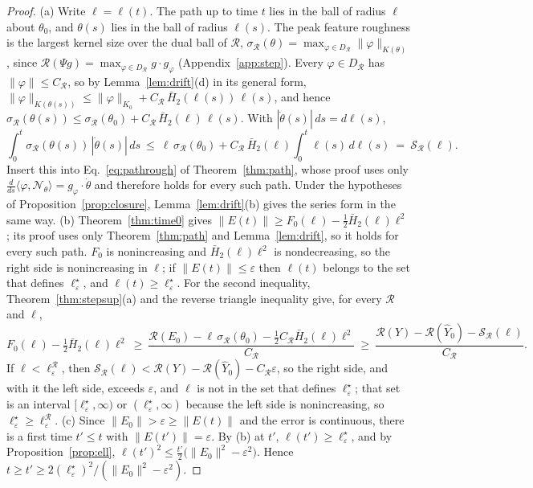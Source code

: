 \documentclass[11pt]{article}
\theoremstyle{definition}
\theoremstyle{remark}
\newcommand{\Net}{\mathcal{N}_\theta}    %
\newcommand{\Rgh}{\mathcal{R}}           %
\newcommand{\sR}{\sigma_{\Rgh}}
\newcommand{\CR}{C_{\Rgh}}
\newcommand{\ip}[2]{\langle #1,#2\rangle}
\begin{document}
\begin{proof}
(a) Write $\ell = \ell(t)$.
The path up to time $t$ lies in the ball of radius $\ell$ about $\theta_0$, and $\theta(s)$ lies in the ball of radius $\ell(s)$.
The peak feature roughness is the largest kernel size over the dual ball of $\Rgh$, $\sR(\theta) = \max_{\varphi\in D_\Rgh}\|\varphi\|_{K(\theta)}$, since $\Rgh(\Psi g) = \max_{\varphi\in D_\Rgh}g\cdot g_\varphi$ (Appendix~\ref{app:step}).
Every $\varphi\in D_\Rgh$ has $\|\varphi\|\le\CR$, so by Lemma~\ref{lem:drift}(d) in its general form, $\|\varphi\|_{K(\theta(s))}\le\|\varphi\|_{K_0} + \CR\,\bar H_2(\ell(s))\,\ell(s)$, and hence $\sR(\theta(s))\le\sR(\theta_0) + \CR\,\bar H_2(\ell)\,\ell(s)$.
With $|\dot\theta(s)|\,ds = d\ell(s)$,
\[
\int_0^t\sR(\theta(s))\,|\dot\theta(s)|\,ds\ \le\ \ell\,\sR(\theta_0) + \CR\,\bar H_2(\ell)\int_0^t\ell(s)\,d\ell(s)\ =\ \mathcal{S}_\Rgh(\ell).
\]
Insert this into Eq.~\eqref{eq:pathrough} of Theorem~\ref{thm:path}, whose proof uses only $\frac{d}{ds}\ip{\varphi}{\Net} = g_\varphi\cdot\dot\theta$ and therefore holds for every such path.
Under the hypotheses of Proposition~\ref{prop:closure}, Lemma~\ref{lem:drift}(b) gives the series form in the same way.
(b) Theorem~\ref{thm:time0} gives $\|E(t)\|\ge F_0(\ell) - \tfrac12\bar H_2(\ell)\ell^2$; its proof uses only Theorem~\ref{thm:path} and Lemma~\ref{lem:drift}, so it holds for every such path.
$F_0$ is nonincreasing and $\bar H_2(\ell)\ell^2$ is nondecreasing, so the right side is nonincreasing in $\ell$; if $\|E(t)\|\le\varepsilon$ then $\ell(t)$ belongs to the set that defines $\ell_\varepsilon^\star$, and $\ell(t)\ge\ell_\varepsilon^\star$.
For the second inequality, Theorem~\ref{thm:stepsup}(a) and the reverse triangle inequality give, for every $\Rgh$ and $\ell$,
\[
F_0(\ell) - \tfrac12\bar H_2(\ell)\ell^2\ \ge\ \frac{\Rgh(E_0) - \ell\,\sR(\theta_0) - \tfrac12\CR\bar H_2(\ell)\ell^2}{\CR}\ \ge\ \frac{\Rgh(Y) - \Rgh(\hat Y_0) - \mathcal{S}_\Rgh(\ell)}{\CR}.
\]
If $\ell<\ell_\varepsilon^\Rgh$, then $\mathcal{S}_\Rgh(\ell) < \Rgh(Y) - \Rgh(\hat Y_0) - \CR\varepsilon$, so the right side, and with it the left side, exceeds $\varepsilon$, and $\ell$ is not in the set that defines $\ell_\varepsilon^\star$; that set is an interval $[\ell_\varepsilon^\star,\infty)$ or $(\ell_\varepsilon^\star,\infty)$ because the left side is nonincreasing, so $\ell_\varepsilon^\star\ge\ell_\varepsilon^\Rgh$.
(c) Since $\|E_0\|>\varepsilon\ge\|E(t)\|$ and the error is continuous, there is a first time $t'\le t$ with $\|E(t')\| = \varepsilon$.
By (b) at $t'$, $\ell(t')\ge\ell_\varepsilon^\star$, and by Proposition~\ref{prop:ell}, $\ell(t')^2\le\tfrac{t'}{2}\big(\|E_0\|^2 - \varepsilon^2\big)$.
Hence $t\ge t'\ge2(\ell_\varepsilon^\star)^2/(\|E_0\|^2 - \varepsilon^2)$.
\end{proof}
\end{document}
